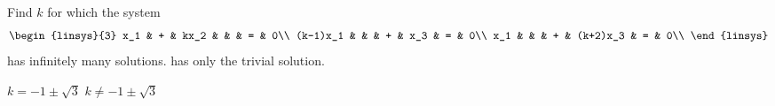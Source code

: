 
\begin{Exercise}[name={},
title={}, 
origin={\cite{OV}},
counter=Exercise]
Find $k$ for which the system
\[
\begin{linsys}{3}
x_1 & + & kx_2 & & & = & 0\\
(k-1)x_1 & & & + & x_3 & = & 0\\
x_1 &  & & + & (k+2)x_3 & = & 0\\
\end{linsys}
\]
\Question has infinitely many solutions.
\Question has only the trivial solution.
\end{Exercise}

\begin{Answer}
\Question $k=-1\pm\sqrt{3}$
\Question $k\neq-1\pm\sqrt{3}$
\end{Answer}

